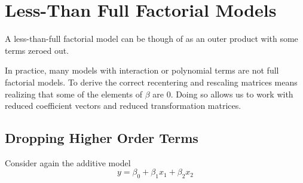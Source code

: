 \documentclass[]{article}
\begin{document}
\hypertarget{less-than-full-factorial-models}{%
\section{Less-Than Full Factorial
Models}\label{less-than-full-factorial-models}}

A less-than-full factorial model can be though of as an outer product
with some terms zeroed out.

In practice, many models with interaction or polynomial terms are not
full factorial models. To derive the correct recentering and rescaling
matrices means realizing that some of the elements of \(\beta\) are
\(0\). Doing so allows us to work with reduced coefficient vectors and
reduced transformation matrices.

\hypertarget{dropping-higher-order-terms}{%
\subsection{Dropping Higher Order
Terms}\label{dropping-higher-order-terms}}

Consider again the additive model
\[y = \beta_0 + \beta_1x_1 + \beta_2x_2\]
\end{document}
